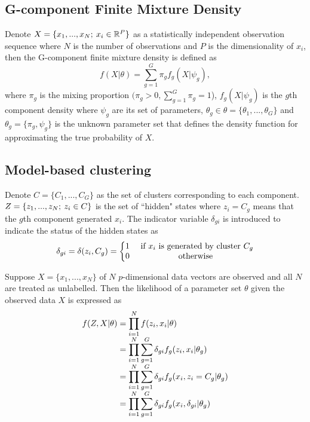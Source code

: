\subsection{G-component Finite Mixture Density}
\label{sec:gcomponentmixturedensity}
Denote \(X=\{x_1, ..., x_N; \: x_i \in \mathbb{R}^P\}\) as a statistically independent observation sequence where \(N\) is the number of observations and \(P\) is the dimensionality of \(x_i\), then the G-component finite mixture density is defined as 
\[
    f(X|\theta) = \sum_{g=1}^{G} \pi_g f_g(X|\psi_g),
\]
where \(\pi_g\) is the mixing proportion \((\pi_g > 0, \sum_{g=1}^{G} \pi_g=1\)), \(f_g(X|\psi_g)\) is the \(g\)th component density where \(\psi_g\) are its set of parameters, \(\theta_g \in \theta=\{\theta_1, ..., \theta_G\}\) and \(\theta_g=\{\pi_g,\psi_g\}\) is the unknown parameter set that defines the density function for approximating the true probability of \(X\).


\subsection{Model-based clustering}
\label{sec:modelbasedclustering}
Denote \(C=\{C_1, ..., C_G\}\) as the set of clusters corresponding to each component. \(Z=\{z_1, ..., z_N;\: z_i \in C\}\) is the set of ``hidden" states where \(z_i=C_g\) means that the \(g\)th component generated \(x_i\). The indicator variable \(\delta_{gi}\) is introduced to indicate the status of the hidden states as
\[
    \delta_{gi} = \delta(z_i,C_g) = \left\{
        \begin{matrix}
            1 & \textup{ if } x_i \textup{ is generated by cluster } C_g \\ 
            0 & \textup{ otherwise }
        \end{matrix}\right.
\]

Suppose \(X=\{x_1, ..., x_N\}\) of \(N\) \(p\)-dimensional data vectors are observed and all \(N\) are treated as unlabelled. Then the likelihood of a parameter set \(\theta\) given the observed data \(X\) is expressed as 
\begin{equation}
    \begin{array}{l@{} >{\displaystyle}l}
        f(Z,X | \theta)\; & =\prod_{i=1}^{N}f(z_i, x_i | \theta) \\ 
                        & =\prod_{i=1}^{N} \sum_{g=1}^{G} \delta_{gi}f_g(z_i,x_i|\theta_g)\\ 
                        & =\prod_{i=1}^{N} \sum_{g=1}^{G} \delta_{gi}f_g(x_i,z_i=C_g|\theta_g) \\ 
                        & =\prod_{i=1}^{N} \sum_{g=1}^{G}\delta_{gi}f_g(x_i,\delta_{gi}|\theta_g)

    \end{array}
\end{equation}

